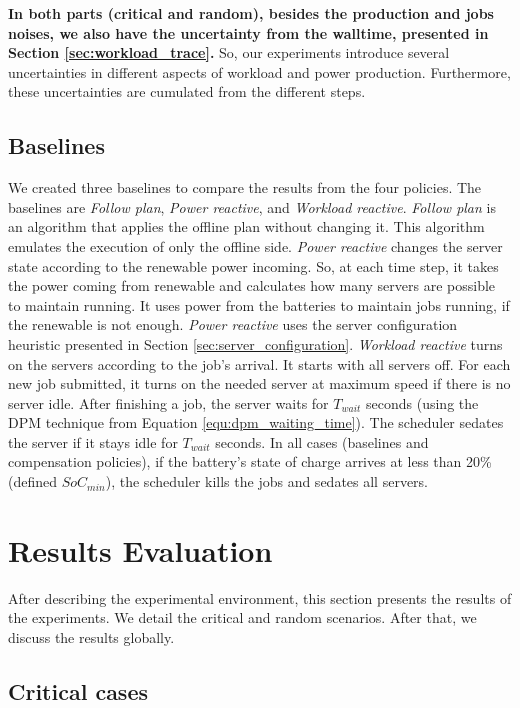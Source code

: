\textbf{In both parts (critical and random), besides the production and jobs noises, we also have the uncertainty from the walltime, presented in Section \ref{sec:workload_trace}.} So, our experiments introduce several uncertainties in different aspects of workload and power production. Furthermore, these uncertainties are cumulated from the different steps.

\subsection{Baselines}
We created three baselines to compare the results from the four policies. The baselines are \emph{Follow plan}, \emph{Power reactive}, and \emph{Workload reactive}. \emph{Follow plan} is an algorithm that applies the offline plan without changing it. This algorithm emulates the execution of only the offline side. \emph{Power reactive} changes the server state according to the renewable power incoming. So, at each time step, it takes the power coming from renewable and calculates how many servers are possible to maintain running. It uses power from the batteries to maintain jobs running, if the renewable is not enough. \emph{Power reactive} uses the server configuration heuristic presented in Section \ref{sec:server_configuration}. \emph{Workload reactive} turns on the servers according to the job's arrival. It starts with all servers off. For each new job submitted, it turns on the needed server at maximum speed if there is no server idle. After finishing a job, the server waits for $T_{wait}$ seconds (using the DPM technique from Equation \ref{equ:dpm_waiting_time}). The scheduler sedates the server if it stays idle for $T_{wait}$ seconds. In all cases (baselines and compensation policies), if the battery's state of charge arrives at less than 20\% (defined $SoC_{min}$), the scheduler kills the jobs and sedates all servers. 

\section{Results Evaluation}

After describing the experimental environment, this section presents the results of the experiments. We detail the critical and random scenarios. After that, we discuss the results globally.

\subsection{Critical cases}

